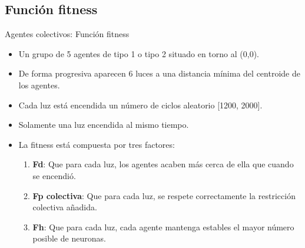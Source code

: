 \documentclass[aspectratio=169]{beamer}
\begin{document}
\subsection{Función fitness}
\begin{frame}{Agentes colectivos: Función fitness}
  \begin{itemize}
    \item Un grupo de 5 agentes de tipo 1 o tipo 2 situado en torno al (0,0).
    \item De forma progresiva aparecen 6 luces a una distancia mínima del centroide de los agentes.
    \item Cada luz está encendida un número de ciclos aleatorio [1200, 2000].
    \item Solamente una luz encendida al mismo tiempo.
    \item La fitness está compuesta por tres factores:
    \begin{enumerate}
      \item \textbf{Fd}: Que para cada luz, los agentes acaben más cerca de ella que cuando se encendió.
      \item \textbf{Fp colectiva}: Que para cada luz, se respete correctamente la restricción colectiva añadida.
      \item \textbf{Fh}: Que para cada luz, cada agente mantenga estables el mayor número posible de neuronas.
    \end{enumerate}
  \end{itemize}

\end{frame}
\end{document}
